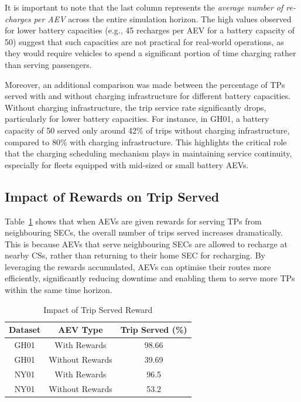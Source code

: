 It is important to note that the last column represents the \textit{average number of re-charges per AEV} across the entire simulation horizon. The high values observed for lower battery capacities (e.g., 45 recharges per AEV for a battery capacity of 50) suggest that such capacities are not practical for real-world operations, as they would require vehicles to spend a significant portion of time charging rather than serving passengers.

Moreover, an additional comparison was made between the percentage of TPs served with and without charging infrastructure for different battery capacities. Without charging infrastructure, the trip service rate significantly drops, particularly for lower battery capacities. For instance, in GH01, a battery capacity of 50 served only around 42\% of trips without charging infrastructure, compared to 80\% with charging infrastructure. This highlights the critical role that the charging scheduling mechanism plays in maintaining service continuity, especially for fleets equipped with mid-sized or small battery AEVs.

\subsection{Impact of Rewards on Trip Served}

Table~\ref{tab:rewards} shows that when AEVs are given rewards for serving TPs from neighbouring SECs, the overall number of trips served increases dramatically. This is because AEVs that serve neighbouring SECs are allowed to recharge at nearby CSs, rather than returning to their home SEC for recharging. By leveraging the rewards accumulated, AEVs can optimise their routes more efficiently, significantly reducing downtime and enabling them to serve more TPs within the same time horizon.

\begin{table}[htbp]
\caption{Impact of Trip Served Reward}
\begin{center}
\begin{tabular}{|c|c|c|}
\hline
\textbf{Dataset} & \textbf{AEV Type} & \textbf{Trip Served (\%)} \\
\hline
GH01 & With Rewards & 98.66 \\
GH01 & Without Rewards & 39.69 \\
\hline
NY01 & With Rewards & 96.5 \\
NY01 & Without Rewards & 53.2 \\
\hline
\end{tabular}
\label{tab:rewards}
\end{center}
\end{table}

